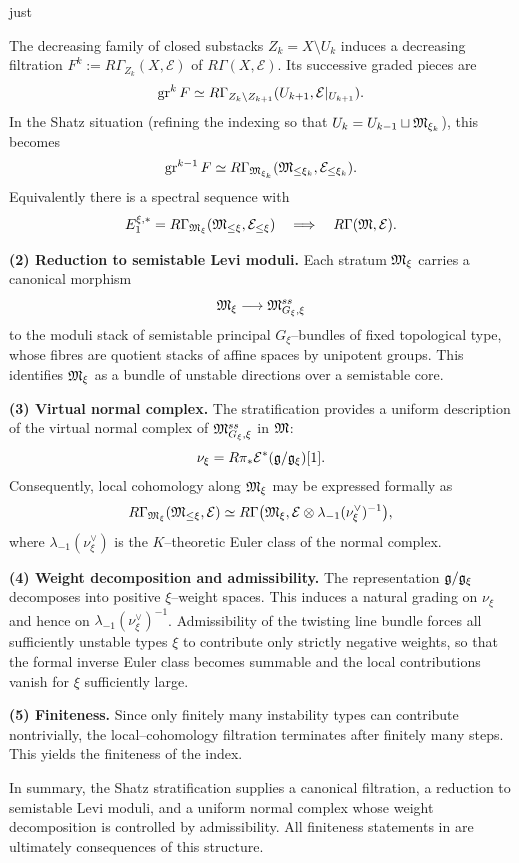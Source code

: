 just \documentclass[12pt]{article}
\begin{document}
The decreasing family of closed substacks $Z_k=X\setminus U_k$ induces a
decreasing filtration $F^k:=R\Gamma_{Z_k}(X,\mathcal E)$ of $R\Gamma(X,\mathcal E)$.
Its successive graded pieces are
\[
\operatorname{gr}^k F \simeq R\Gamma_{Z_k\setminus Z_{k+1}}(U_{k+1},\mathcal E|_{U_{k+1}}).
\]
In the Shatz situation (refining the indexing so that $U_k=U_{k-1}\sqcup \mathfrak{M}_{\xi_k}$),
this becomes
\[
\operatorname{gr}^{k-1}F \simeq R\Gamma_{\mathfrak{M}_{\xi_k}}(\mathfrak{M}_{\le\xi_k},\mathcal E_{\le\xi_k}).
\]
Equivalently there is a spectral sequence with
\[
E_1^{\xi,*} = R\Gamma_{\mathfrak{M}_\xi}(\mathfrak{M}_{\le\xi},\mathcal E_{\le\xi})
\quad\Longrightarrow\quad
R\Gamma(\mathfrak{M},\mathcal E).
\]

\medskip
\noindent\textbf{(2) Reduction to semistable Levi moduli.}
Each stratum $\mathfrak{M}_\xi$ carries a canonical morphism
\[
\mathfrak{M}_\xi \longrightarrow \mathfrak{M}^{ss}_{G_\xi,\xi}
\]
to the moduli stack of semistable principal $G_\xi$--bundles of fixed topological
type, whose fibres are quotient stacks of affine spaces by unipotent groups.
This identifies $\mathfrak{M}_\xi$ as a bundle of unstable directions over a semistable
core.

\medskip
\noindent\textbf{(3) Virtual normal complex.}
The stratification provides a uniform description of the virtual normal complex
of $\mathfrak{M}^{ss}_{G_\xi,\xi}$ in $\mathfrak{M}$:
\[
\nu_\xi = R\pi_*\mathcal E^*(\mathfrak{g}/\mathfrak{g}_\xi)[1].
\]
Consequently, local cohomology along $\mathfrak{M}_\xi$ may be expressed formally as
\[
R\Gamma_{\mathfrak{M}_\xi}(\mathfrak{M}_{\le\xi},\mathcal E)
\simeq
R\Gamma\bigl(\mathfrak{M}_\xi,
\mathcal E\otimes \lambda_{-1}(\nu_\xi^\vee)^{-1}\bigr),
\]
where $\lambda_{-1}(\nu_\xi^\vee)$ is the $K$--theoretic Euler class of the normal
complex.

\medskip
\noindent\textbf{(4) Weight decomposition and admissibility.}
The representation $\mathfrak{g}/\mathfrak{g}_\xi$ decomposes into positive $\xi$--weight
spaces.  This induces a natural grading on $\nu_\xi$ and hence on
$\lambda_{-1}(\nu_\xi^\vee)^{-1}$.  Admissibility of the twisting line bundle
forces all sufficiently unstable types $\xi$ to contribute only strictly negative
weights, so that the formal inverse Euler class becomes summable and the local
contributions vanish for $\xi$ sufficiently large.

\medskip
\noindent\textbf{(5) Finiteness.}
Since only finitely many instability types can contribute nontrivially, the
local--cohomology filtration terminates after finitely many steps.  This yields
the finiteness of the index.

\medskip
In summary, the Shatz stratification supplies a canonical filtration, a reduction
to semistable Levi moduli, and a uniform normal complex whose weight decomposition
is controlled by admissibility.  All finiteness statements in
\cite{TelemanWoodward} are ultimately consequences of this structure.
\end{document}

